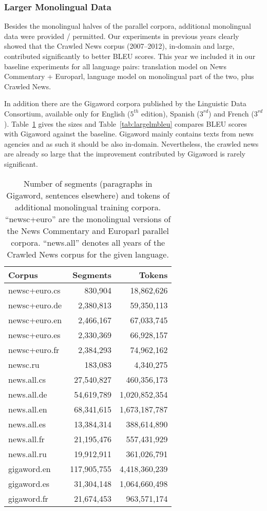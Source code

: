 \documentclass[11pt,letterpaper]{article}
\def\Tref#1{Table~\ref{#1}}
\begin{document}
\subsubsection{Larger Monolingual Data}
\label{sec:lm}

Besides the monolingual halves of the parallel corpora, additional monolingual data were provided / permitted.
Our experiments in previous years clearly showed that the Crawled News corpus (2007--2012), in-domain and large, contributed
significantly to better BLEU scores. This year we included it in our baseline experiments
for all language pairs: translation model on News Commentary + Europarl,
language model on monolingual part of the two, plus Crawled News.

In addition there are the Gigaword corpora published by the Linguistic Data Consortium, available only for English ($5^{th}$ edition), Spanish ($3^{rd}$) and French ($3^{rd}$).
\Tref{tab:mono} gives the sizes
and \Tref{tab:largelmbleu} compares BLEU scores with Gigaword against the baseline.
Gigaword mainly contains texts from news agencies and as such it should be also in-domain.
Nevertheless, the crawled news are already so large that the improvement contributed by Gigaword
is rarely significant.

\begin{table}[htbl]
\begin{center}
\begin{tabular}{l | r r}
Corpus & Segments & Tokens\\
\hline
newsc+euro.cs & 830,904 & 18,862,626\\
newsc+euro.de & 2,380,813 & 59,350,113\\
newsc+euro.en & 2,466,167 & 67,033,745\\
newsc+euro.es & 2,330,369 & 66,928,157\\
newsc+euro.fr & 2,384,293 & 74,962,162\\
newsc.ru & 183,083 & 4,340,275\\
news.all.cs & 27,540,827 & 460,356,173\\
news.all.de & 54,619,789 & 1,020,852,354\\
news.all.en & 68,341,615 & 1,673,187,787\\
news.all.es & 13,384,314 & 388,614,890\\
news.all.fr & 21,195,476 & 557,431,929\\
news.all.ru & 19,912,911 & 361,026,791\\
gigaword.en & 117,905,755 & 4,418,360,239\\
gigaword.es & 31,304,148 & 1,064,660,498\\
gigaword.fr & 21,674,453 & 963,571,174\\
\end{tabular}
\end{center}
\caption{Number of segments (paragraphs in Gigaword, sentences elsewhere) and tokens of additional monolingual training corpora. ``newsc+euro'' are the monolingual versions of the News Commentary and Europarl parallel corpora. ``news.all'' denotes all years of the Crawled News corpus for the given language.}
\label{tab:mono}
\end{table}
\end{document}
